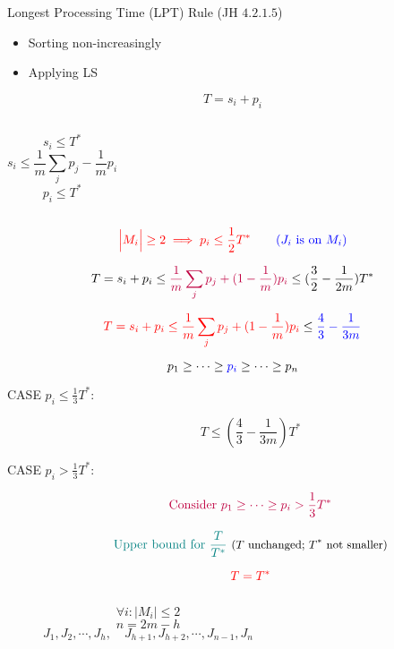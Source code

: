 \begin{frame}
  \begin{exampleblock}{Longest Processing Time (LPT) Rule (JH $4.2.1.5$)}
	\begin{itemize}
	  \item Sorting non-increasingly
	  \item Applying LS
	\end{itemize}
  \end{exampleblock}

  \pause
  \[
	T = s_i + p_i 
  \]

  \begin{columns}
	  \[
		s_i \le T^{\ast}
	  \]
	  \[
		s_i \le \frac{1}{m} \sum_{j} p_j - \frac{1}{m} p_{i}
	  \]
	  \[
		p_i \le T^{\ast}
	  \]
  \end{columns}

  \pause
  \vspace{0.50cm}
  \[
	\textcolor{red}{\Big|M_i\Big| \ge 2 \implies p_i \le \frac{1}{2} T^{\ast}} \qquad \textcolor{blue}{(J_i \text{ is on } M_i)}
  \]

  \pause
  \[
	T = s_i + p_i \le \textcolor{purple}{\frac{1}{m} \sum_{j} p_j + (1 - \frac{1}{m}) p_{i}} \le (\frac{3}{2} - \frac{1}{2m}) T^{\ast}
  \]
\end{frame}

\begin{frame}
  \[
	\textcolor{red}{T = s_i + p_i \le \frac{1}{m} \sum_{j} p_j + (1 - \frac{1}{m}) p_{i}} \le \textcolor{blue}{\frac{4}{3} - \frac{1}{3m}}
  \]

  \pause
  \[
	p_1 \ge \cdots \ge \textcolor{blue}{p_i} \ge \cdots \ge p_n
  \]

  \begin{description}
	\item[CASE $p_i \le \frac{1}{3} T^{\ast}$:] 
	  \[
		T \le (\frac{4}{3} - \frac{1}{3m}) T^{\ast}
	  \]
	\item[CASE $p_i > \frac{1}{3} T^{\ast}$:]
	  \pause
	  \[
		\textcolor{purple}{\text{Consider } p_1 \ge \cdots \ge p_i > \frac{1}{3} T^{\ast}}
	  \]

	  \pause
	  \[
		\text{\textcolor{teal}{Upper bound for $\frac{T}{T^{\ast}}$} \small ($T$ unchanged; $T^{\ast}$ not smaller)}
	  \]

	  \pause
	  \[
		\textcolor{red}{T = T^{\ast}}
	  \]

	  \vspace{-0.60cm}
	  \begin{columns}
		  \pause
		  \[
			\forall i: \Big|M_i\Big| \le 2
		  \]
		  \[
			n = 2m - h 
		  \]
		  \pause
		  \[
			J_1, J_2, \cdots, J_h, \quad  J_{h+1}, J_{h+2}, \cdots, J_{n-1}, J_{n}
		  \]
	  \end{columns}
  \end{description}
\end{frame}

